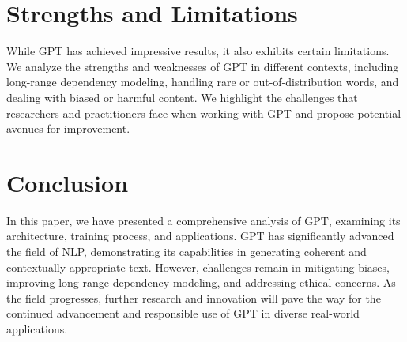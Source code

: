 \documentclass[a4paper,10pt,twocolumn]{article}
\begin{document}
\section{Strengths and Limitations}
While GPT has achieved impressive results, it also exhibits certain limitations. We analyze the strengths and weaknesses of GPT in different contexts, including long-range dependency modeling, handling rare or out-of-distribution words, and dealing with biased or harmful content. We highlight the challenges that researchers and practitioners face when working with GPT and propose potential avenues for improvement.

\section{Conclusion}
In this paper, we have presented a comprehensive analysis of GPT, examining its architecture, training process, and applications. GPT has significantly advanced the field of NLP, demonstrating its capabilities in generating coherent and contextually appropriate text. However, challenges remain in mitigating biases, improving long-range dependency modeling, and addressing ethical concerns. As the field progresses, further research and innovation will pave the way for the continued advancement and responsible use of GPT in diverse real-world applications.
\end{document}
